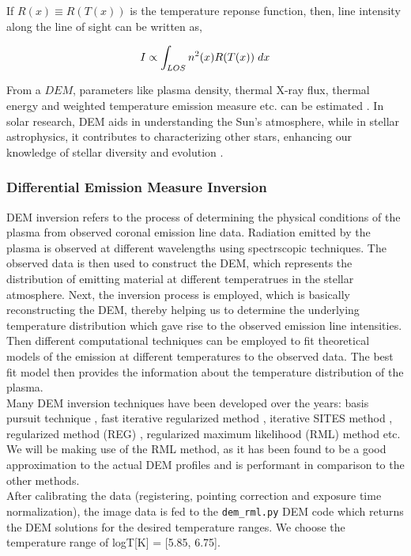 If $R(x) \equiv R(T(x))$ is the temperature reponse function, then, line intensity along the line of sight can be written as,

\vspace{-.75cm}
\begin{center}
    \begin{equation*}
        I \propto \int_{LOS} n^2(x) R(T(x)) \hspace{0.1cm} dx
    \end{equation*}
\end{center}


From a $DEM$, parameters like plasma density, thermal X-ray flux, thermal energy and weighted temperature emission measure etc. can be estimated \citep{Su2018-fq}. In solar research, DEM aids in understanding the Sun's atmosphere, while in stellar astrophysics, it contributes to characterizing other stars, enhancing our knowledge of stellar diversity and evolution \citep{Namekata2023-rq}.

\subsubsection{Differential Emission Measure Inversion}

DEM inversion refers to the process of determining the physical conditions of the plasma from observed coronal emission line data. Radiation emitted by the plasma is observed at different wavelengths using spectrscopic techniques. The observed data is then used to construct the DEM, which represents the distribution of emitting material at different temperatrues in the stellar atmosphere. Next, the inversion process is employed, which is basically reconstructing the DEM, thereby helping us to determine the underlying temperature distribution which gave rise to the observed emission line intensities. Then different computational techniques can be employed to fit theoretical models of the emission at different temperatures to the observed data. The best fit model then provides the information about the temperature distribution of the plasma.\\

Many DEM inversion techniques have been developed over the years: basis pursuit technique \citep{Cheung2015}, fast iterative regularized method \citep{Plowman2013}, iterative SITES method \citep{Morgan2019}, regularized method (REG) \citep{Hannah2012}, regularized maximum likelihood (RML) method \citep{Massa2023} etc. We will be making use of the RML method, as it has been found to be a good approximation to the actual DEM profiles and is performant in comparison to the other methods.\\

After calibrating the data (registering, pointing correction and exposure time normalization), the image data is fed to the \texttt{dem\_rml.py} DEM code which returns the DEM solutions for the desired temperature ranges. We choose the temperature range of logT[K] = [5.85, 6.75].
